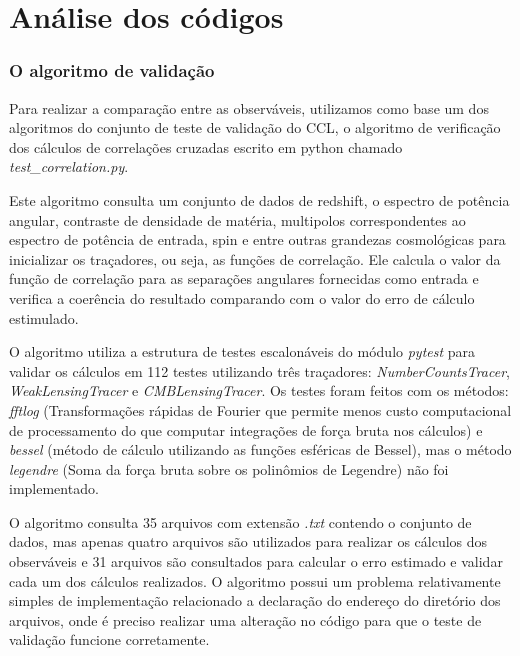 	\chapter*{Análise dos códigos}

\subsection*{O algoritmo de validação}

Para realizar a comparação entre as observáveis, utilizamos como base um dos algoritmos do conjunto de teste de validação do CCL, o algoritmo de verificação dos cálculos de correlações cruzadas escrito em python chamado  \textit{test\_correlation.py}.

Este algoritmo consulta um conjunto de dados de redshift, o espectro de potência angular, contraste de densidade de matéria, multipolos correspondentes ao espectro de potência de entrada, spin e entre outras grandezas cosmológicas para inicializar os traçadores, ou seja, as funções de correlação. Ele calcula o valor da função de correlação para as separações angulares fornecidas como entrada e verifica a coerência do resultado comparando com o valor do erro de cálculo estimulado.

O algoritmo utiliza a estrutura de testes escalonáveis do módulo \textit{pytest} para validar os cálculos em 112 testes utilizando três traçadores:  \textit{NumberCountsTracer}, \textit{WeakLensingTracer} e \textit{CMBLensingTracer}. Os testes foram feitos com os métodos: \textit{fftlog} (Transformações rápidas de Fourier que permite menos custo computacional de processamento do que computar integrações de força bruta nos cálculos) e \textit{bessel} (método de cálculo utilizando as funções esféricas de Bessel), mas o método \textit{legendre} (Soma da força bruta sobre os polinômios de Legendre) não foi implementado.

O algoritmo consulta 35 arquivos com extensão \textit{.txt} contendo o conjunto de dados, mas apenas quatro arquivos são utilizados para realizar os cálculos dos observáveis e 31 arquivos são consultados para calcular o erro estimado e validar cada um dos cálculos realizados. O algoritmo possui um problema relativamente simples de implementação relacionado a declaração do endereço do diretório dos arquivos, onde é preciso realizar uma alteração no código para que o teste de validação funcione corretamente. 

